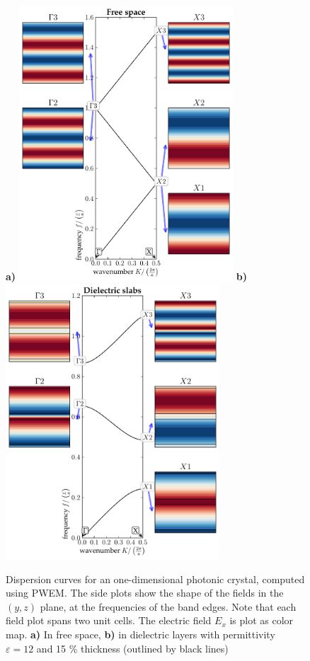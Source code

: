\documentclass[letterpaper,12pt]{report}
\begin{document}
\begin{figure}[ht] \caption{Dispersion curves for an one-dimensional photonic crystal, computed using PWEM. The side plots show the shape of the fields in the $(y,z)$ plane, at the frequencies of the band edges. Note that each field plot spans two unit cells. The electric field $E_x$ is plot as color map. \textbf{a)} In free space, \textbf{b)} in dielectric layers with permittivity $\varepsilon = 12$ and 15 \% thickness (outlined by black lines)} \label{fg_1dbd} \centering 
\textbf{a)}	\includegraphics[width=8cm]{img/Slab_eps001_PWEM.pdf}
\textbf{b)}	\includegraphics[width=8cm]{img/Slab_eps012_d15.pdf}
\end{figure}
\end{document}
